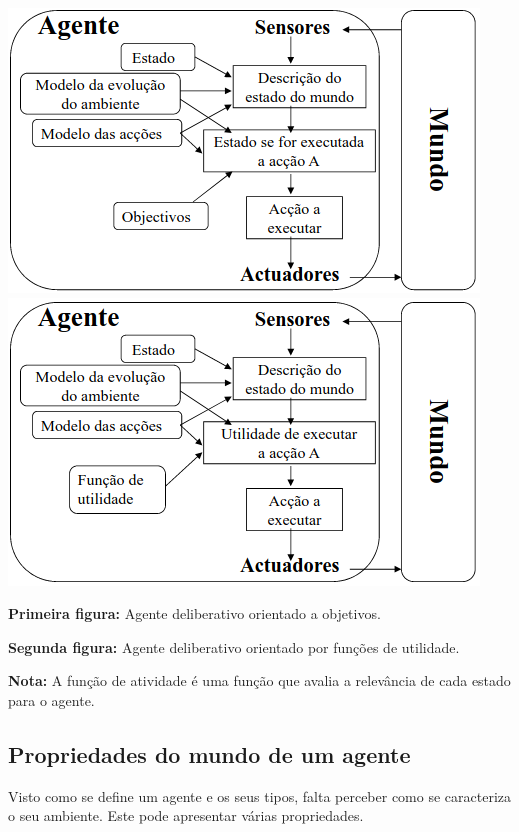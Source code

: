 \documentclass{article}
\begin{document}
\begin{center}
  \includegraphics[scale=0.4]{14}
  \includegraphics[scale=0.4]{15}
\end{center}

\begin{flushleft}
  \textbf{Primeira figura:} Agente deliberativo orientado a objetivos.

  \textbf{Segunda figura:} Agente deliberativo orientado por funções de utilidade.
\end{flushleft}

\begin{flushleft}
  \textbf{Nota:} A função de atividade é uma função que avalia a relevância de cada estado para o agente.
\end{flushleft}

\subsection{Propriedades do mundo de um agente}

Visto como se define um agente e os seus tipos, falta perceber como se caracteriza o seu
ambiente. Este pode apresentar várias propriedades.
\end{document}
